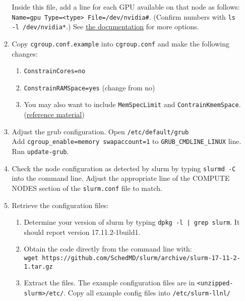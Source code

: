 \begin{enumerate}
\begin{enumerate}
        Inside this file, add a line for each GPU available on that node as follows: \texttt{Name=gpu Type=<type> File=/dev/nvidia\#}. (Confirm numbers with \texttt{ls -l /dev/nvidia*}.) See \href{https://slurm.schedmd.com/gres.conf.html}{the documentation} for more options.

      \item Copy \texttt{cgroup.conf.example} into \texttt{cgroup.conf} and make the following changes:

        \begin{enumerate}
          \item \texttt{ConstrainCores=no}
          \item \texttt{ConstrainRAMSpace=yes} (change from no)
          \item You may also want to include \texttt{MemSpecLimit} and \texttt{ContrainKmemSpace}.  (\href{https://www.mankier.com/5/cgroup.conf}{reference material})
        \end{enumerate}
		
      \item Adjust the grub configuration. Open \texttt{/etc/default/grub} \\
        Add \texttt{cgroup\_enable=memory swapaccount=1} to  \texttt{GRUB\_CMDLINE\_LINUX} line. \\
        Run \texttt{update-grub}.

      \item Check the node configuration as detected by slurm by typing \texttt{slurmd -C} into the command line. Adjust the appropriate line of the COMPUTE NODES section of the \texttt{slurm.conf} file to match.

      \item Retrieve the configuration files:

        \begin{enumerate}
          \item Determine your version of slurm by typing \texttt{dpkg -l | grep slurm}. It should report version 17.11.2-1build1. 

          \item Obtain the code directly from the command line with: \\ 
            \texttt{wget https://github.com/SchedMD/slurm/archive/slurm-17-11-2-1.tar.gz}
	 
          \item Extract the files. The example configuration files are in \texttt{<unzipped-slurm>/etc/}. Copy all example config files into \texttt{/etc/slurm-llnl/}
        \end{enumerate}


\end{enumerate}
\end{enumerate}
